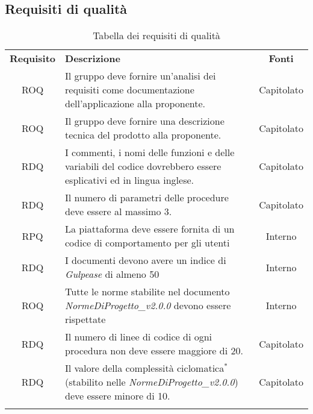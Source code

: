 \subsection{Requisiti di qualità}
\begin{longtable}{| c | p{10cm} | c |}
		\rowcolor{LightBlue}
		\color{white}\bfseries Requisito & \color{white}\bfseries Descrizione & \color{white}\bfseries Fonti\\[0.25cm]
		ROQ & Il gruppo deve fornire un'analisi dei requisiti come documentazione dell'applicazione alla proponente. & Capitolato \\
		ROQ & Il gruppo deve fornire una descrizione tecnica del prodotto alla proponente. & Capitolato \\ 
		RDQ & I commenti, i nomi delle funzioni e delle variabili del codice dovrebbero essere esplicativi ed in lingua inglese. & Capitolato \\ 
		RDQ & Il numero di parametri delle procedure deve essere al massimo 3. & Capitolato \\
		RPQ & La piattaforma deve essere fornita di un codice di comportamento per gli utenti & Interno\\
		RDQ & I documenti devono avere un indice di \textit{Gulpease} di almeno 50 & Interno\\
		ROQ & Tutte le norme stabilite nel documento \textit{NormeDiProgetto\_v2.0.0} devono essere rispettate & Interno\\
		RDQ & Il numero di linee di codice di ogni procedura non deve essere maggiore di 20. & Capitolato\\
		RDQ & Il valore della complessità ciclomatica$^*$ (stabilito nelle \textit{NormeDiProgetto\_v2.0.0}) deve essere minore di 10. & Capitolato\\
		\hline
		\caption{Tabella dei requisiti di qualità}
\end{longtable}